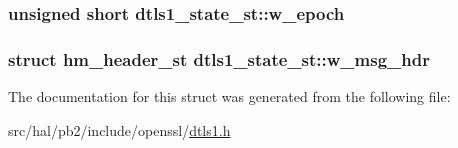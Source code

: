 \subsubsection[{\texorpdfstring{w\+\_\+epoch}{w_epoch}}]{\setlength{\rightskip}{0pt plus 5cm}unsigned short dtls1\+\_\+state\+\_\+st\+::w\+\_\+epoch}\hypertarget{structdtls1__state__st_ac2348d97c73af669675caa7791fc7320}{}\label{structdtls1__state__st_ac2348d97c73af669675caa7791fc7320}
\subsubsection[{\texorpdfstring{w\+\_\+msg\+\_\+hdr}{w_msg_hdr}}]{\setlength{\rightskip}{0pt plus 5cm}struct {\bf hm\+\_\+header\+\_\+st} dtls1\+\_\+state\+\_\+st\+::w\+\_\+msg\+\_\+hdr}\hypertarget{structdtls1__state__st_aa16e59d7f125177caa2b5939fcb13890}{}\label{structdtls1__state__st_aa16e59d7f125177caa2b5939fcb13890}


The documentation for this struct was generated from the following file\+:\begin{DoxyCompactItemize}
\item 
src/hal/pb2/include/openssl/\hyperlink{dtls1_8h}{dtls1.\+h}\end{DoxyCompactItemize}
